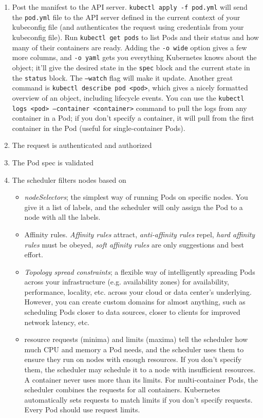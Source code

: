 \documentclass[table, xcdraw]{article}%
\begin{document}
\begin{enumerate}
	Pods have a lot of properties, and anything you don’t explicitly define in a YAML file gets populated with defaults.
    \item Post the manifest to the API server. \texttt{kubectl apply -f pod.yml} will send the \texttt{pod.yml} file to the API server defined in the current context of your kubeconfig file (and authenticates the request using credentials from your kubeconfig file). Run \texttt{kubectl get pods} to list Pods and their status and how many of their containers are ready. Adding the \texttt{-o wide} option gives a few more columns, and \texttt{-o yaml} gets you everything Kubernetes knows about the object; it'll give the desired state in the \texttt{spec} block and the current state in the \texttt{status} block. The \texttt{--watch} flag will make it update. Another great command is \texttt{kubectl describe pod <pod>}, which gives a nicely formatted overview of an object, including lifecycle events. You can use the \texttt{kubectl logs <pod> --container <container>} command to pull the logs from any container in a Pod; if you don't specify a container, it will pull from the first container in the Pod (useful for single-container Pods).
    \item The request is authenticated and authorized
    \item The Pod spec is validated
    \item The scheduler filters nodes based on
	\begin{itemize}
		\item \emph{nodeSelectors}; the simplest way of running Pods on specific nodes. You give it a list of labels, and the scheduler will only assign the Pod to a node with all the labels.
		\item Affinity rules. \emph{Affinity rules} attract, \emph{anti-affinity rules} repel, \emph{hard affinity rules} must be obeyed, \emph{soft affinity rules} are only suggestions and best effort.
		\item \emph{Topology spread constraints}; a flexible way of intelligently spreading Pods across your infrastructure (e.g. availability zones) for availability, performance, locality, etc. across your cloud or data center’s underlying. However, you can create custom domains for almost anything, such as scheduling Pods closer to data sources, closer to clients for improved network latency, etc.
		\item resource requests (minima) and limits (maxima) tell the scheduler how much CPU and memory a Pod needs, and the scheduler uses them to ensure they run on nodes with enough resources. If you don’t specify them, the scheduler may schedule it to a node with insufficient resources. A container never uses more than its limits. For multi-container Pods, the scheduler combines the requests for all containers. Kubernetes automatically sets requests to match limits if you don’t specify requests. Every Pod should use request limits.

\end{itemize}
\end{enumerate}
\end{document}
